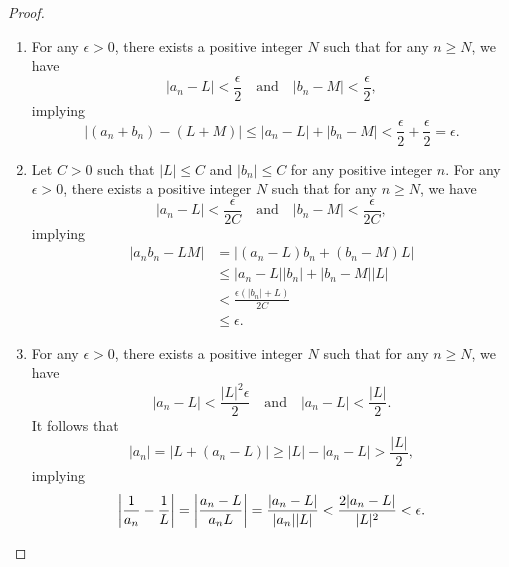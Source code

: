 \begin{proof}
  \leavevmode
  \begin{enumerate}
    \item For any $\epsilon > 0$, there exists a positive integer $N$ such that
    for any $n \geq N$, we have
    \begin{equation*}
      |a_n - L| < \frac{\epsilon}{2}
      \quad \text{and} \quad
      |b_n - M| < \frac{\epsilon}{2},
    \end{equation*}
    implying
    \begin{equation*}
      |(a_n + b_n) - (L + M)|
      \leq |a_n - L| + |b_n - M|
      < \frac{\epsilon}{2} + \frac{\epsilon}{2}
      = \epsilon.
    \end{equation*}
    
    \item Let $C > 0$ such that $|L| \leq C$ and $|b_n| \leq C$ for any
    positive integer $n$.
    For any $\epsilon > 0$, there exists a positive integer $N$ such that for
    any $n \geq N$, we have
    \begin{equation*}
      |a_n - L| < \frac{\epsilon}{2C}
      \quad \text{and} \quad
      |b_n - M| < \frac{\epsilon}{2C},
    \end{equation*}
    implying
    \begin{align*}
      |a_nb_n - LM|
      &= |(a_n - L)b_n + (b_n - M)L| \\
      &\leq |a_n - L||b_n| + |b_n - M||L| \\
      &< \frac{\epsilon (|b_n| + L)}{2C} \\
      &\leq \epsilon.
    \end{align*}
  
    \item For any $\epsilon > 0$, there exists a positive integer $N$ such that
    for any $n \geq N$, we have
    \begin{equation*}
      |a_n - L| < \frac{|L|^2\epsilon}{2}
      \quad \text{and} \quad
      |a_n - L| < \frac{|L|}{2}.
    \end{equation*}
    It follows that
    \begin{equation*}
      |a_n|
      = |L + (a_n - L)|
      \geq |L| - |a_n - L|
      > \frac{|L|}{2},
    \end{equation*}
    implying
    \begin{equation*}
      \left|\frac{1}{a_n} - \frac{1}{L}\right|
      = \left|\frac{a_n - L}{a_nL}\right|
      = \frac{|a_n - L|}{|a_n||L|}
      < \frac{2|a_n - L|}{|L|^2}
      < \epsilon.
      \qedhere
    \end{equation*}
  \end{enumerate}
\end{proof}

